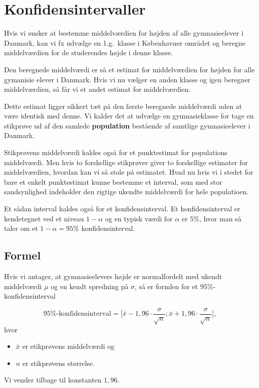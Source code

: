 
\section{Konfidensintervaller}
Hvis vi ønsker at bestemme middelværdien for højden af alle gymnasieelever i Danmark, kan vi fx udvælge en 1.g.\ klasse i Københavner området og beregne middelværdien for de studerendes højde i denne klasse.

Den beregnede middelværdi er så et estimat for middelværdien for højden for alle gymanisie elever i Danmark. Hvis vi nu vælger en anden klasse og igen beregner middelværdien, så får vi et andet estimat for middelværdien.

Dette estimat ligger sikkert tæt på den første beregnede middelværdi uden at være identisk med denne. Vi kalder det at udvælge en gymnasieklasse for tage en stikprøve ud af den samlede \textbf{population} bestående af samtlige gymnasieelever i Danmark.

Stikprøvens middelværdi kaldes også for et punktestimat for populations middelværdi. Men hvis to forskellige stikprøver giver to forskellige estimater for middelværdien, hvordan kan vi så stole på estimatet. Hvad nu hvis vi i stedet for bare et enkelt punktestimat kunne bestemme et interval, som med stor sandsynlighed indeholder den rigtige ukendte middelværdi for hele populatioen.

Et sådan interval kaldes også for et konfidensinterval. Et konfidensinterval er kendetegnet ved et niveau \(1 - \alpha\) og en typisk værdi for \(\alpha\) er \(5\%\), hvor man så taler om et \(1-\alpha = 95\%\) konfidensinterval.

\subsection{Formel}
Hvis vi antager, at gymnasieelevers højde er normalfordelt med ukendt middelværdi \(\mu\) og en kendt spredning på \(\sigma\), så er formlen for et \(95\%\)-konfidens\-interval

\begin{equation}
  95\%\mbox{-konfidensinterval} = \Big[\bar{x} - 1,96⋅\frac{\sigma}{\sqrt{n}};
  \bar{x} +1,96⋅\frac{\sigma}{\sqrt{n}} \Big],
\end{equation}
hvor
\begin{itemize}
  \item \(\bar{x}\) er stikprøvens middelværdi og
  \item \(n\) er stikprøvens størrelse.
\end{itemize}
Vi vender tilbage til konstanten \(1,96\).

